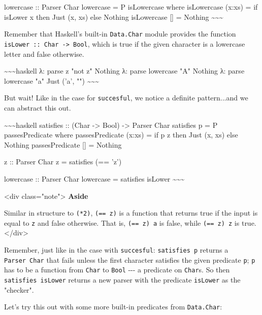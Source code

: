 \documentclass[]{article}
\begin{document}
lowercase :: Parser Char lowercase = P isLowercase where isLowercase (x:xs) = if
isLower x then Just (x, xs) else Nothing isLowercase {[}{]} = Nothing
\textasciitilde{}\textasciitilde{}\textasciitilde{}

Remember that Haskell's built-in \texttt{Data.Char} module provides the function
\texttt{isLower\ ::\ Char\ -\textgreater{}\ Bool}, which is true if the given
character is a lowercase letter and false otherwise.

\textasciitilde{}\textasciitilde{}\textasciitilde{}haskell λ: parse z "not z"
Nothing λ: parse lowercase "A" Nothing λ: parse lowercase "a" Just ('a', "")
\textasciitilde{}\textasciitilde{}\textasciitilde{}

But wait! Like in the case for \texttt{succesful}, we notice a definite
pattern...and we can abstract this out.

\textasciitilde{}\textasciitilde{}\textasciitilde{}haskell satisfies :: (Char
-\textgreater{} Bool) -\textgreater{} Parser Char satisfies p = P
passesPredicate where passesPredicate (x:xs) = if p z then Just (x, xs) else
Nothing passesPredicate {[}{]} = Nothing

z :: Parser Char z = satisfies (== 'z')

lowercase :: Parser Char lowercase = satisfies isLower
\textasciitilde{}\textasciitilde{}\textasciitilde{}

\textless{}div class="note"\textgreater{} \textbf{Aside}

Similar in structure to \texttt{(*2)},
\texttt{(==\ \textquotesingle{}z\textquotesingle{})} is a function that returns
true if the input is equal to \texttt{\textquotesingle{}z\textquotesingle{}} and
false otherwise. That is,
\texttt{(==\ \textquotesingle{}z\textquotesingle{})\ \textquotesingle{}a\textquotesingle{}}
is false, while
\texttt{(==\ \textquotesingle{}z\textquotesingle{})\ \textquotesingle{}z\textquotesingle{}}
is true. \textless{}/div\textgreater{}

Remember, just like in the case with \texttt{succesful}: \texttt{satisfies\ p}
returns a \texttt{Parser\ Char} that fails unless the first character satisfies
the given predicate \texttt{p}; \texttt{p} has to be a function from
\texttt{Char} to \texttt{Bool} -\/-\/- a predicate on \texttt{Char}s. So then
\texttt{satisfies\ isLower} returns a new parser with the predicate
\texttt{isLower} as the "checker".

Let's try this out with some more built-in predicates from \texttt{Data.Char}:
\end{document}
